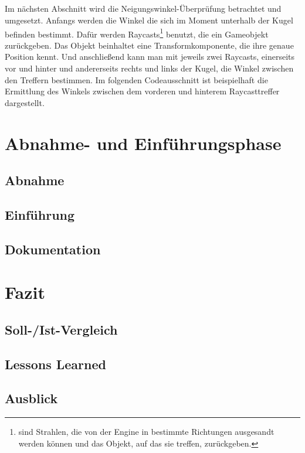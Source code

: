 \paragraph{}
Im nächsten Abschnitt wird die Neigungswinkel-Überprüfung betrachtet und umgesetzt. Anfangs werden die Winkel die sich im Moment unterhalb der Kugel befinden bestimmt. Dafür werden Raycasts\footnote{ sind Strahlen, die von der Engine in bestimmte Richtungen ausgesandt werden können und das Objekt, auf das sie treffen, zurückgeben.} benutzt, die ein Gameobjekt zurückgeben. Das Objekt beinhaltet eine Transformkomponente, die ihre genaue Position kennt. Und anschließend kann man mit jeweils zwei Raycasts, einerseits vor und hinter und andererseits rechts und links der Kugel, die Winkel zwischen den Treffern bestimmen. Im folgenden Codeausschnitt ist beispielhaft die Ermittlung des Winkels zwischen dem vorderen und hinterem Raycasttreffer dargestellt.



\chapter{Abnahme- und Einführungsphase}
\section{Abnahme}
\section{Einführung}
\section{Dokumentation}

\chapter{Fazit}
\section{Soll-/Ist-Vergleich}
\section{Lessons Learned}
\section{Ausblick}
